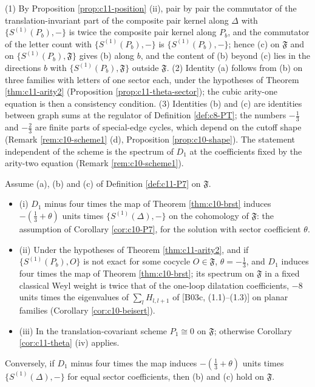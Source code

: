 \begin{remark}
\label{rem:c11-P7dep}
(1) By Proposition \ref{prop:c11-position} (ii), pair by pair the commutator of the translation-invariant part of the composite pair kernel along $\Delta$ with $\{S^{(1)}(P_b),-\}$ is twice the composite pair kernel along $P_b$, and the commutator of the letter count with $\{S^{(1)}(P_b),-\}$ is $\{S^{(1)}(P_b),-\}$; hence (c) on $\mathfrak F$ and on $\{S^{(1)}(P_b),\mathfrak F\}$ gives (b) along $b$, and the content of (b) beyond (c) lies in the directions $b$ with $\{S^{(1)}(P_b),\mathfrak F\}$ outside $\mathfrak F$. (2) Identity (a) follows from (b) on three families with letters of one sector each, under the hypotheses of Theorem \ref{thm:c11-arity2} (Proposition \ref{prop:c11-theta-sector}); the cubic arity-one equation is then a consistency condition. (3) Identities (b) and (c) are identities between graph sums at the regulator of Definition \ref{def:c8-PT}; the numbers $-\tfrac13$ and $-\tfrac23$ are finite parts of special-edge cycles, which depend on the cutoff shape (Remark \ref{rem:c10-scheme1} (d), Proposition \ref{prop:c10-shape}). The statement independent of the scheme is the spectrum of $D_1$ at the coefficients fixed by the arity-two equation (Remark \ref{rem:c10-scheme1}).
\end{remark}

\begin{theorem}
\label{thm:c11-P7}
Assume (a), (b) and (c) of Definition \ref{def:c11-P7} on $\mathfrak F$.
\begin{itemize}
\item (i) $D_1$ minus four times the map of Theorem \ref{thm:c10-brst} induces $-(\tfrac13+\theta)$ units times $\{S^{(1)}(\Delta),-\}$ on the cohomology of $\mathfrak F$: the assumption of Corollary \ref{cor:c10-P7}, for the solution with sector coefficient $\theta$.
\item (ii) Under the hypotheses of Theorem \ref{thm:c11-arity2}, and if $\{S^{(1)}(P_b),O\}$ is not exact for some cocycle $O\in\mathfrak F$, $\theta=-\tfrac13$, and $D_1$ induces four times the map of Theorem \ref{thm:c10-brst}; its spectrum on $\mathfrak F$ in a fixed classical Weyl weight is twice that of the one-loop dilatation coefficients, $-8$ units times the eigenvalues of $\sum_lH_{l,l+1}$ of [B03c, (1.1)--(1.3)] on planar families (Corollary \ref{cor:c10-beisert}).
\item (iii) In the translation-covariant scheme $P_1\cong0$ on $\mathfrak F$; otherwise Corollary \ref{cor:c11-theta} (iv) applies.
\end{itemize}
Conversely, if $D_1$ minus four times the map induces $-(\tfrac13+\theta)$ units times $\{S^{(1)}(\Delta),-\}$ for equal sector coefficients, then (b) and (c) hold on $\mathfrak F$.
\end{theorem}

